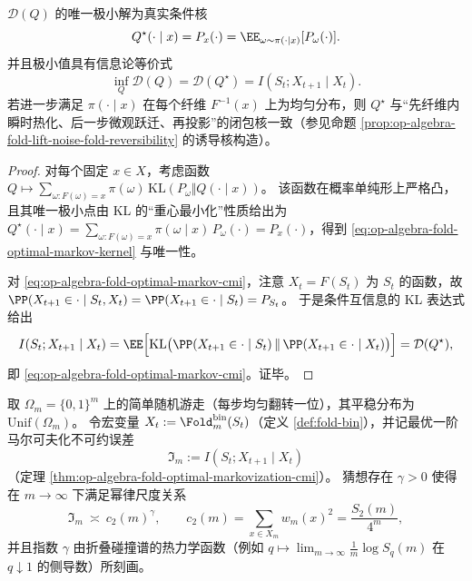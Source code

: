 \begin{theorem}[最优一阶马尔可夫化与条件互信息恒等式]\label{thm:op-algebra-fold-optimal-markovization-cmi}
\(\mathcal D(Q)\) 的唯一极小解为真实条件核
\begin{equation}\label{eq:op-algebra-fold-optimal-markov-kernel}
Q^\star(\cdot\mid x)=P_x(\cdot)=\EE_{\omega\sim \pi(\cdot\mid x)}[P_\omega(\cdot)].
\end{equation}
并且极小值具有信息论等价式
\begin{equation}\label{eq:op-algebra-fold-optimal-markov-cmi}
\inf_Q \mathcal D(Q)=\mathcal D(Q^\star)=I(S_t;X_{t+1}\mid X_t).
\end{equation}
若进一步满足 \(\pi(\cdot\mid x)\) 在每个纤维 \(F^{-1}(x)\) 上为均匀分布，则 \(Q^\star\) 与“先纤维内瞬时热化、后一步微观跃迁、再投影”的闭包核一致（参见命题 \ref{prop:op-algebra-fold-lift-noise-fold-reversibility} 的诱导核构造）。
\end{theorem}
\begin{proof}
对每个固定 \(x\in X\)，考虑函数
\(
Q\mapsto \sum_{\omega:F(\omega)=x}\pi(\omega)\,\mathrm{KL}(P_\omega\Vert Q(\cdot\mid x))
\)。
该函数在概率单纯形上严格凸，且其唯一极小点由 KL 的“重心最小化”性质给出为
\(
Q^\star(\cdot\mid x)=\sum_{\omega:F(\omega)=x}\pi(\omega\mid x)\,P_\omega(\cdot)=P_x(\cdot)
\)，得到 \eqref{eq:op-algebra-fold-optimal-markov-kernel} 与唯一性。

对 \eqref{eq:op-algebra-fold-optimal-markov-cmi}，注意 \(X_t=F(S_t)\) 为 \(S_t\) 的函数，故
\(
\PP(X_{t+1}\in\cdot\mid S_t,X_t)=\PP(X_{t+1}\in\cdot\mid S_t)=P_{S_t}
\)。
于是条件互信息的 KL 表达式给出
\[
I(S_t;X_{t+1}\mid X_t)
=\EE\Bigl[\mathrm{KL}\bigl(\PP(X_{t+1}\in\cdot\mid S_t)\,\Vert\,\PP(X_{t+1}\in\cdot\mid X_t)\bigr)\Bigr]
=\mathcal D(Q^\star),
\]
即 \eqref{eq:op-algebra-fold-optimal-markov-cmi}。证毕。
\end{proof}

\begin{conjecture}\label{conj:op-algebra-fold-nonmarkovianity-collision-control}
取 \(\Omega_m=\{0,1\}^m\) 上的简单随机游走（每步均匀翻转一位），其平稳分布为 \(\mathrm{Unif}(\Omega_m)\)。
令宏变量 \(X_t:=\Fold^{\mathrm{bin}}_m(S_t)\)（定义 \ref{def:fold-bin}），并记最优一阶马尔可夫化不可约误差
\[
\mathfrak I_m:=I(S_t;X_{t+1}\mid X_t)
\]
（定理 \ref{thm:op-algebra-fold-optimal-markovization-cmi}）。
猜想存在 \(\gamma>0\) 使得在 \(m\to\infty\) 下满足幂律尺度关系
\[
\mathfrak I_m\ \asymp\ c_2(m)^{\gamma},
\qquad
c_2(m)=\sum_{x\in X_m}w_m(x)^2=\frac{S_2(m)}{4^m},
\]
并且指数 \(\gamma\) 由折叠碰撞谱的热力学函数（例如 \(q\mapsto \lim_{m\to\infty}\frac{1}{m}\log S_q(m)\) 在 \(q\downarrow 1\) 的侧导数）所刻画。
\end{conjecture}

